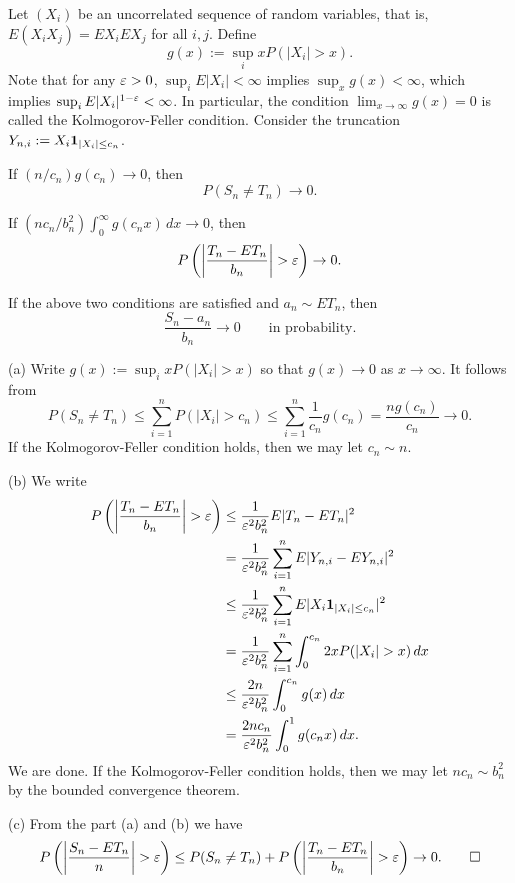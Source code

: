 \documentclass{../../large}
\begin{document}
\begin{prb}
Let $(X_i)$ be an uncorrelated sequence of random variables, that is, $E(X_iX_j)=EX_iEX_j$ for all $i,j$.
Define
\[g(x):=\sup_ixP(|X_i|>x).\]
Note that for any $\varepsilon>0$, $\sup_iE|X_i|<\infty$ implies $\sup_xg(x)<\infty$, which implies $\sup_iE|X_i|^{1-\varepsilon}<\infty$.
In particular, the condition $\lim_{x\to\infty}g(x)=0$ is called the Kolmogorov-Feller condition.
Consider the truncation $Y_{n,i}:=X_i\mathbf{1}_{|X_i|\le c_n}$.
\begin{parts}
\item If $(n/c_n)g(c_n)\to0$, then
\[P(S_n\ne T_n)\to0.\]
\item If $(nc_n/b_n^2)\int_0^\infty g(c_nx)\,dx\to0$, then
\[P\left(\left|\frac{T_n-ET_n}{b_n}\right|>\e\right)\to0.\]
\item If the above two conditions are satisfied and $a_n\sim ET_n$, then
\[\frac{S_n-a_n}{b_n}\to0\qquad\text{in probability}.\]
\end{parts}
\end{prb}
\begin{pf}
(a)
Write $g(x):=\sup_ixP(|X_i|>x)$ so that $g(x)\to0$ as $x\to\infty$.
It follows from
\[P(S_n\ne T_n)\le\sum_{i=1}^nP(|X_i|>c_n)\le\sum_{i=1}^n\frac1{c_n}g(c_n)=\frac{ng(c_n)}{c_n}\to0.\]
If the Kolmogorov-Feller condition holds, then we may let $c_n\sim n$.

(b)
We write
\begin{align*}
P\left(\left|\frac{T_n-ET_n}{b_n}\right|>\e\right)
&\le\frac1{\e^2b_n^2}E|T_n-ET_n|^2\\
&=\frac1{\e^2b_n^2}\sum_{i=1}^nE|Y_{n,i}-EY_{n,i}|^2\\
&\le\frac1{\e^2b_n^2}\sum_{i=1}^nE|X_i\1_{|X_i|\le c_n}|^2\\
&=\frac1{\e^2b_n^2}\sum_{i=1}^n\int_0^{c_n}2xP(|X_i|>x)\,dx\\
&\le\frac{2n}{\e^2b_n^2}\int_0^{c_n}g(x)\,dx\\
&=\frac{2nc_n}{\e^2b_n^2}\int_0^1g(c_nx)\,dx.
\end{align*}
We are done.
If the Kolmogorov-Feller condition holds, then we may let $nc_n\sim b_n^2$ by the bounded convergence theorem.

(c)
From the part (a) and (b) we have
\[P\left(\left|\frac{S_n-ET_n}n\right|>\e\right)\le P(S_n\ne T_n)+P\left(\left|\frac{T_n-ET_n}{b_n}\right|>\e\right)\to0.\qedhere\]
\end{pf}


\begin{prb}
\end{prb}
\end{document}
